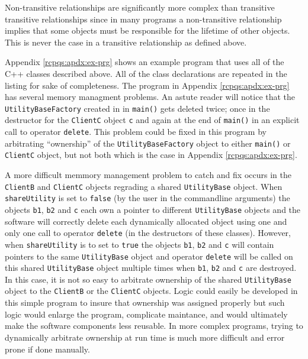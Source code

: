 \documentclass[pdf,ps2pdf,11pt]{SANDreport}
\begin{document}
Non-transitive relationships are significantly more complex than
transitive transitive relationships since in many programs a
non-transitive relationship implies that some objects must be
responsible for the lifetime of other objects.  This is never the case
in a transitive relationship as defined above.

Appendix {}\ref{rcpqs:apdx:ex-prg} shows an example program that uses
all of the C++ classes described above.  All of the class declarations
are repeated in the listing for sake of completeness.  The program in
Appendix {}\ref{rcpqs:apdx:ex-prg} has several memory managment
problems. An astute reader will notice that the
{}\texttt{Utility\-Base\-Factory} created in in {}\texttt{main()} gets
deleted twice; once in the destructor for the {}\texttt{ClientC}
object {}\texttt{c} and again at the end of {}\texttt{main()} in an
explicit call to operator {}\texttt{delete}.  This problem could be
fixed in this program by arbitrating ``ownership'' of the
{}\texttt{Utility\-Base\-Factory} object to either {}\texttt{main()}
or {}\texttt{ClientC} object, but not both which is the case in
Appendix {}\ref{rcpqs:apdx:ex-prg}.

A more difficult memmory management problem to catch and fix occurs in
the {}\texttt{ClientB} and {}\texttt{ClientC} objects regrading a
shared {}\texttt{Utility\-Base} object.  When {}\texttt{shareUtility}
is set to {}\texttt{false} (by the user in the commandline arguments)
the objects {}\texttt{b1}, {}\texttt{b2} and {}\texttt{c} each own a
pointer to different {}\texttt{Utility\-Base} objects and the software
will correctly delete each dynamically allocated object using one and
only one call to operator {}\texttt{delete} (in the destructors of
these classes).  However, when {}\texttt{shareUtility} is to set to
{}\texttt{true} the objects {}\texttt{b1}, {}\texttt{b2} and
{}\texttt{c} will contain pointers to the same
{}\texttt{Utility\-Base} object and operator {}\texttt{delete} will be
called on this shared {}\texttt{Utility\-Base} object multiple times
when {}\texttt{b1}, {}\texttt{b2} and {}\texttt{c} are destroyed.  In
this case, it is not so easy to arbitrate ownership of the shared
{}\texttt{Utility\-Base} object to the {}\texttt{ClientB} or the
{}\texttt{ClientC} objects.  Logic could easily be developed in this
simple program to insure that ownership was assigned properly but such
logic would enlarge the program, complicate maintance, and would
ultimately make the software components less reusable.  In more
complex programs, trying to dynamically arbitrate ownership at run
time is much more difficult and error prone if done manually.
\end{document}
